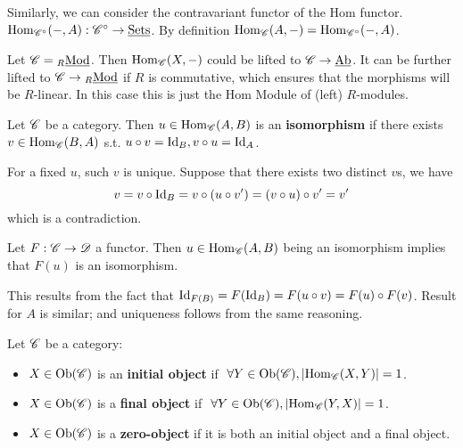\documentclass{article}
\begin{document}
\begin{remark}
    Similarly, we can consider the contravariant functor of the Hom functor. $\mathrm{Hom}_{\mathscr{C}^{\circ}}(-, A) : \mathscr{C}^{\circ} \to \underline{\textup{Sets}}$. By definition $\mathrm{Hom}_{\mathscr{C}}(A, -) = \mathrm{Hom}_{\mathscr{C}^{\circ}}(-, A)$.
\end{remark}

\begin{remark}
    Let $\mathscr{C} = {}_{R}\underline{\textup{Mod}}$. Then $\mathrm{Hom}_{\mathscr{C}}(X, -)$ could be lifted to $\mathscr{C} \to \underline{\textup{Ab}}$. It can be further lifted to $\mathscr{C} \to {}_{R}\underline{\textup{Mod}}$ if $R$ is commutative, which ensures that the morphisms will be $R$-linear. In this case this is just the Hom Module of (left) $R$-modules. 
\end{remark}

\begin{definition}
    Let $\mathscr{C}$ be a category. Then $u\in \mathrm{Hom}_{\mathscr{C}}(A, B)$ is an \textbf{isomorphism} if there exists $v \in \mathrm{Hom}_{\mathscr{C}}(B, A)$ s.t. $u\circ v = \mathrm{Id}_B, v\circ u = \mathrm{Id}_A$.
\end{definition}

\begin{remark}
    For a fixed $u$, such $v$ is unique. Suppose that there exists two distinct $v$s, we have
    \[
        v = v \circ \mathrm{Id}_B = v \circ (u \circ v') = (v \circ u) \circ v' = v'
    \]
    which is a contradiction.
\end{remark}

\begin{remark}
    Let $F: \mathscr{C} \to \mathscr{D}$ a functor. Then $u\in \mathrm{Hom}_{\mathscr{C}} (A, B)$ being an isomorphism implies that $F(u)$ is an isomorphism.

    This results from the fact that $\mathrm{Id}_{F(B)} = F(\mathrm{Id}_B) = F(u \circ v) = F(u) \circ F(v)$. Result for $A$ is similar; and uniqueness follows from the same reasoning. 
\end{remark}

\begin{definition}
    Let $\mathscr{C}$ be a category:
    \begin{itemize}
        \item $X \in \mathrm{Ob}(\mathscr{C})$ is an \textbf{initial object} if $\ \forall Y \in \mathrm{Ob}(\mathscr{C}), \left|\mathrm{Hom}_{\mathscr{C}}(X, Y)\right| = 1$.
        \item $X \in \mathrm{Ob}(\mathscr{C})$ is a \textbf{final object} if $\ \forall Y \in \mathrm{Ob}(\mathscr{C}), \left|\mathrm{Hom}_{\mathscr{C}}(Y, X)\right| = 1$.
        \item $X \in \mathrm{Ob}(\mathscr{C})$ is a \textbf{zero-object} if it is both an initial object and a final object. 
    \end{itemize} 
\end{definition}
\end{document}

